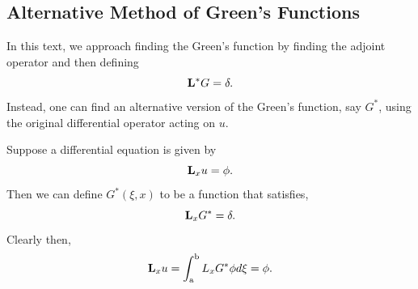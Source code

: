 \subsection{Alternative Method of Green's Functions}
In this text, we approach finding the Green's function by finding the adjoint operator and then defining 
\begin{equation*}
    \mathrm{\bf{L^*}} G = \delta.
\end{equation*}
Instead, one can find an alternative version of the Green's function, say \(G^*\), using the original differential operator acting on \(u\). 

Suppose a differential equation is given by
\begin{equation*}
    \mathrm{\bf{L}}_x u = \phi.
\end{equation*}
Then we can define \(G^*(\xi,x)\) to be a function that satisfies,
\begin{equation*}
    \mathrm{\bf{L}}_x G^* = \delta.
\end{equation*}
Clearly then,
\begin{equation*}
    \mathrm{\bf{L}}_x u = \int_\mathrm{a}^\mathrm{b} L_xG^*\phi d\xi = \phi.
\end{equation*}